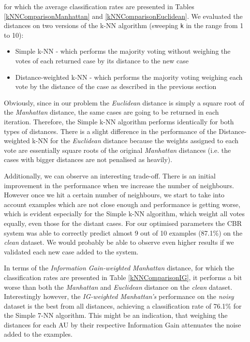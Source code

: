 \documentclass[a4paper]{article}
\begin{document}
for which the average classification rates are presented in Tables \ref{kNNComparisonManhattan} and \ref{kNNComparisonEuclidean}. We evaluated the distances on two versions of the k-NN algorithm (sweeping \texttt{k} in the range from 1 to 10):
\begin{itemize}
\item Simple k-NN - which performs the majority voting without weighing the votes of each returned case by its distance to the new case
\item Distance-weighted k-NN - which performs the majority voting weighing each vote by the distance of the case as described in the previous section
\end{itemize}

Obviously, since in our problem the \emph{Euclidean} distance is simply a square root of the \emph{Manhattan} distance, the same cases are going to be returned in each iteration. Therefore, the Simple k-NN algorithm performs identically for both types of distances. There is a slight difference in the performance of the Distance-weighted k-NN for the \emph{Euclidean} distance because the weights assigned to each vote are essentially square roots of the original \emph{Manhattan} distances (i.e. the cases with bigger distances are not penalised as heavily). \medskip

Additionally, we can observe an interesting trade-off. There is an initial improvement in the performance when we increase the number of neighbours. However once we hit a certain number of neighbours, we start to take into account examples which are not close enough and performance is getting worse, which is evident especially for the Simple k-NN algorithm, which weight all votes equally, even those for the distant cases. For our optimised parameters the CBR system was able to correctly predict almost 9 out of 10 examples (87.1\%) on the \emph{clean} dataset. We would probably be able to observe even higher results if we validated each new case added to the system. \medskip

In terms of the \emph{Information Gain-weighted Manhattan} distance, for which the classification rates are presented in Table \ref{kNNComparisonIG}, it performs a bit worse than both the \emph{Manhattan} and \emph{Euclidean} distance on the \emph{clean} dataset. Interestingly however, the \emph{IG-weighted Manhattan's} performance on the \emph{noisy} dataset is the best from all distances, achieving a classification rate of 76.1\% for the Simple 7-NN algorithm. This might be an indication, that weighing the distances for each AU by their respective Information Gain attenuates the noise added to the examples. \medskip
\end{document}
